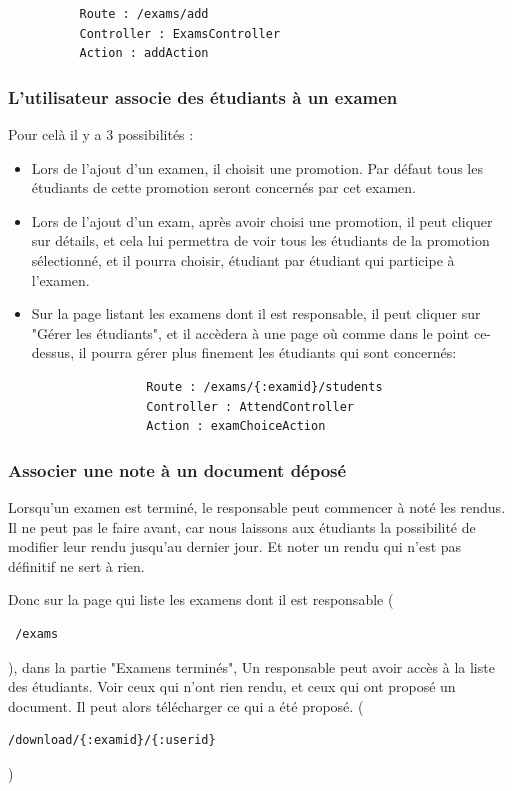 \documentclass{report}
\begin{document}
        \begin{verbatim}
          Route : /exams/add
          Controller : ExamsController
          Action : addAction
        \end{verbatim}
      \subsubsection{L'utilisateur associe des étudiants à un examen}
        Pour celà il y a 3 possibilités :

        \begin{itemize}
          \item{
              Lors de l'ajout d'un examen, il choisit une promotion. Par défaut
              tous les étudiants de cette promotion seront concernés par cet
              examen.
            }
          \item{
              Lors de l'ajout d'un exam, après avoir choisi une promotion, il peut
              cliquer sur détails, et cela lui permettra de voir tous les étudiants
              de la promotion sélectionné, et il pourra choisir, étudiant par
              étudiant qui participe à l'examen.
            }
          \item{
              Sur la page listant les examens dont il est responsable, il peut
              cliquer sur "Gérer les étudiants", et il accèdera à une page où
              comme dans le point ce-dessus, il pourra gérer plus finement les
              étudiants qui sont concernés:
              \vspace{1em}
              \begin{verbatim}
                Route : /exams/{:examid}/students
                Controller : AttendController
                Action : examChoiceAction
              \end{verbatim}
            }
        \end{itemize}
      \subsubsection{Associer une note à un document déposé}
        Lorsqu'un examen est terminé, le responsable peut commencer à noté les rendus.
        Il ne peut pas le faire avant, car nous laissons aux étudiants la possibilité
        de modifier leur rendu jusqu'au dernier jour. Et noter un rendu qui n'est pas
        définitif ne sert à rien.

        Donc sur la page qui liste les examens dont il est responsable (
        \begin{verbatim} /exams \end{verbatim}), dans la partie "Examens terminés",
        Un responsable peut avoir accès à la liste des étudiants. Voir ceux qui
        n'ont rien rendu, et ceux qui ont proposé un document. Il peut alors
        télécharger ce qui a été proposé. 
        (\begin{verbatim}/download/{:examid}/{:userid}\end{verbatim})
\end{document}
